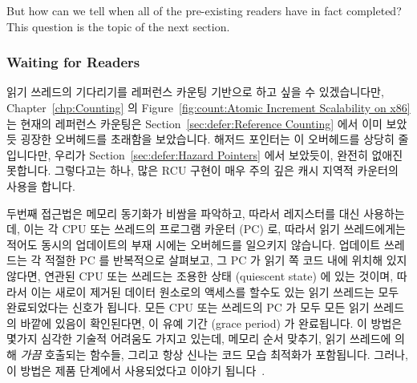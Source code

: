 But how can we tell when all of the pre-existing readers have in
fact completed?
This question is the topic of the next section.

\fi

\subsubsection{Waiting for Readers}
\label{sec:defer:Waiting for Readers}

읽기 쓰레드의 기다리기를 레퍼런스 카운팅 기반으로 하고 싶을 수 있겠습니다만,
Chapter~\ref{chp:Counting}
의
Figure~\ref{fig:count:Atomic Increment Scalability on x86}
는 현재의 레퍼런스 카운팅은
Section~\ref{sec:defer:Reference Counting}
에서 이미 보았듯 굉장한 오버헤드를 초래함을 보았습니다.
해저드 포인터는 이 오버헤드를 상당히 줄입니다만, 우리가
Section~\ref{sec:defer:Hazard Pointers}
에서 보았듯이, 완전히 없애진 못합니다.
그렇다고는 하나, 많은 RCU 구현이 매우 주의 깊은 캐시 지역적 카운터의 사용을
합니다.

두번째 접근법은 메모리 동기화가 비쌈을 파악하고, 따라서 레지스터를 대신
사용하는데, 이는 각 CPU 또는 쓰레드의 프로그램 카운터 (PC) 로, 따라서 읽기
쓰레드에게는 적어도 동시의 업데이트의 부재 시에는 오버헤드를 일으키지 않습니다.
업데이트 쓰레드는 각 적절한 PC 를 반복적으로 살펴보고, 그 PC 가 읽기 쪽 코드
내에 위치해 있지 않다면, 연관된 CPU 또는 쓰레드는 조용한 상태 (quiescent state)
에 있는 것이며, 따라서 이는 새로이 제거된 데이터 원소로의 액세스를 할수도 있는
읽기 쓰레드는 모두 완료되었다는 신호가 됩니다.
모든 CPU 또는 쓰레드의 PC 가 모두 모든 읽기 쓰레드의 바깥에 있음이 확인된다면,
이 유예 기간 (grace period) 가 완료됩니다.
이 방법은 몇가지 심각한 기술적 어려움도 가지고 있는데, 메모리 순서 맞추기, 읽기
쓰레드에 의해 \emph{가끔} 호출되는 함수들, 그리고 항상 신나는 코드 모습
최적화가 포함됩니다.
그러나, 이 방법은 제품 단계에서 사용되었다고 이야기
됩니다~\cite{MikeAsh2015Apple}.

